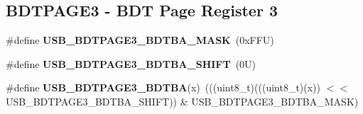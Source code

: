 \subsection*{B\+D\+T\+P\+A\+G\+E3 -\/ B\+DT Page Register 3}
\begin{DoxyCompactItemize}
\item 
\mbox{\label{group___u_s_b___register___masks_ga9081479345a744c85a74643600921b64}} 
\#define {\bfseries U\+S\+B\+\_\+\+B\+D\+T\+P\+A\+G\+E3\+\_\+\+B\+D\+T\+B\+A\+\_\+\+M\+A\+SK}~(0x\+F\+F\+U)
\item 
\mbox{\label{group___u_s_b___register___masks_ga9850caac94013a6e84f9af9cbe0e0827}} 
\#define {\bfseries U\+S\+B\+\_\+\+B\+D\+T\+P\+A\+G\+E3\+\_\+\+B\+D\+T\+B\+A\+\_\+\+S\+H\+I\+FT}~(0\+U)
\item 
\mbox{\label{group___u_s_b___register___masks_ga1576cadd83c016ae56239b96238ffeb8}} 
\#define {\bfseries U\+S\+B\+\_\+\+B\+D\+T\+P\+A\+G\+E3\+\_\+\+B\+D\+T\+BA}(x)~(((uint8\+\_\+t)(((uint8\+\_\+t)(x)) $<$$<$ U\+S\+B\+\_\+\+B\+D\+T\+P\+A\+G\+E3\+\_\+\+B\+D\+T\+B\+A\+\_\+\+S\+H\+I\+FT)) \& U\+S\+B\+\_\+\+B\+D\+T\+P\+A\+G\+E3\+\_\+\+B\+D\+T\+B\+A\+\_\+\+M\+A\+SK)
\end{DoxyCompactItemize}
